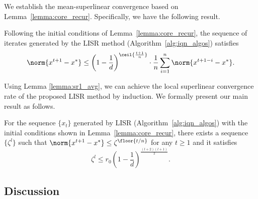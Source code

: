 We establish the mean-superlinear convergence based on Lemma~\ref{lemma:core_recur}. Specifically, we have the following result.
\begin{lemma}
    Following the initial conditions of Lemma~\ref{lemma:core_recur},
    the sequence of iterates generated by the LISR method (Algorithm~\ref{alg:iqn_algos}) satisfies
    \begin{equation*}
        \norm{x^{t+1} - x^*} \leq \left(1 - \frac{1}{d}\right)^{\ceil{\frac{t+1}{n}}}\cdot\frac{1}{n}\sum_{i=1}^n \norm{x^{t+1-i} - x^*}.
    \end{equation*}
        \label{lemma:sr1_avg}
\end{lemma}

Using Lemma \ref{lemma:sr1_avg}, we can achieve the local superlinear convergence rate of the proposed LISR method by induction.
We formally present our main result as follows.
\begin{theorem}
    For the sequence $\{x_t\}$ generated by LISR  (Algorithm~\ref{alg:iqn_algos}) with the initial conditions shown in  Lemma~\ref{lemma:core_recur}, there exists a sequence $\{\zeta^l\}$ such that $\norm{x^{t+1} - x^*} \leq \zeta^{\floor{{t}/{n}}}$ for any $t\geq 1$ and it satisfies
    \begin{equation}
        \zeta^l \leq r_0 \left(1 - \frac{1}{d}\right)^{\frac{(l+2)(l+1)}{2}}.
        \label{main_result_eq}
    \end{equation}
    \label{thm:glins_res}
\end{theorem}

\subsection{Discussion}

